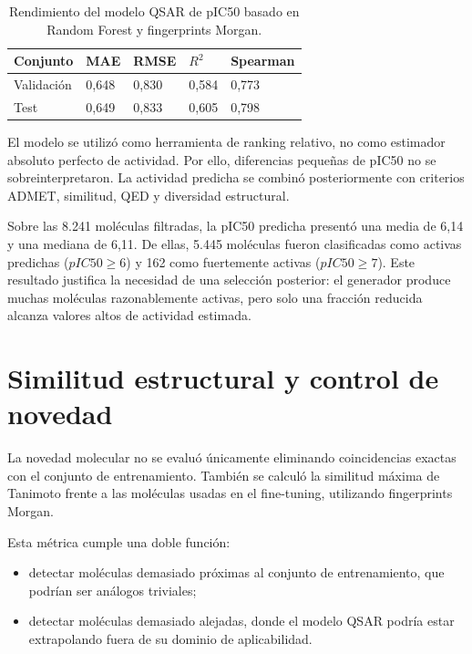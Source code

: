 \documentclass[IB]{TFUOC}%
\begin{document}
\begin{table}[H]
    \centering
    \small
    \begin{tabular}{p{3cm} p{2.5cm} p{2.5cm} p{2.5cm} p{2.5cm}}
        \hline
        \textbf{Conjunto} & \textbf{MAE} & \textbf{RMSE} & \textbf{$R^2$} & \textbf{Spearman} \\
        \hline
        Validación & 0,648 & 0,830 & 0,584 & 0,773 \\
        \hline
        Test & 0,649 & 0,833 & 0,605 & 0,798 \\
        \hline
    \end{tabular}
    \caption{Rendimiento del modelo QSAR de pIC50 basado en Random Forest y fingerprints Morgan.}
    \label{tab:metricas_qsar}
\end{table}

El modelo se utilizó como herramienta de ranking relativo, no como estimador absoluto perfecto de actividad. Por ello, diferencias pequeñas de pIC50 no se sobreinterpretaron. La actividad predicha se combinó posteriormente con criterios ADMET, similitud, QED y diversidad estructural.

Sobre las 8.241 moléculas filtradas, la pIC50 predicha presentó una media de 6,14 y una mediana de 6,11. De ellas, 5.445 moléculas fueron clasificadas como activas predichas ($pIC50 \geq 6$) y 162 como fuertemente activas ($pIC50 \geq 7$). Este resultado justifica la necesidad de una selección posterior: el generador produce muchas moléculas razonablemente activas, pero solo una fracción reducida alcanza valores altos de actividad estimada.

\section{Similitud estructural y control de novedad}

La novedad molecular no se evaluó únicamente eliminando coincidencias exactas con el conjunto de entrenamiento. También se calculó la similitud máxima de Tanimoto frente a las moléculas usadas en el fine-tuning, utilizando fingerprints Morgan.

Esta métrica cumple una doble función:

\begin{itemize}
    \item detectar moléculas demasiado próximas al conjunto de entrenamiento, que podrían ser análogos triviales;
    \item detectar moléculas demasiado alejadas, donde el modelo QSAR podría estar extrapolando fuera de su dominio de aplicabilidad.
\end{itemize}
\end{document}
